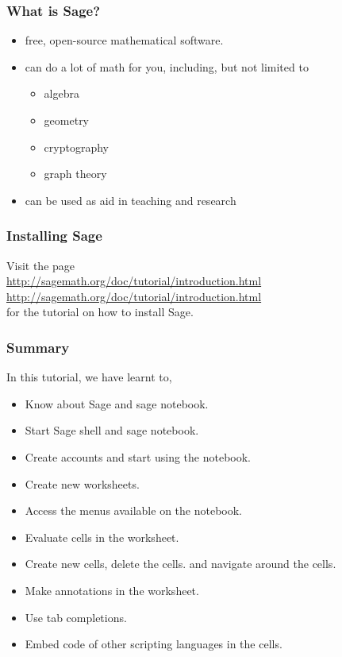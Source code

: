 \documentclass[presentation]{beamer}
\begin{document}
\begin{frame}
\frametitle{What is Sage?}
\label{sec-3}


\begin{itemize}
\item free, open-source mathematical software.
\item can do a lot of math for you, including, but not limited to
\begin{itemize}
\item algebra
\item geometry
\item cryptography
\item graph theory
\end{itemize}
\item can be used as aid in teaching and research
\end{itemize}
\end{frame}
\begin{frame}
\frametitle{Installing Sage}
\label{sec-4}

   Visit the page\\
\vspace{8pt}   
   \url{http://sagemath.org/doc/tutorial/introduction.html}\\
\vspace{5pt}   
   \url{http://sagemath.org/doc/tutorial/introduction.html}\\ 
\vspace{8pt}   
   for the tutorial on how to install Sage.
\end{frame}
\begin{frame}
\frametitle{Summary}
\label{sec-5}

 In this tutorial, we have learnt to, 


\begin{itemize}
\item Know about Sage and sage notebook.
\item Start Sage shell  and sage notebook.
\item Create accounts and start using the notebook.
\item Create new worksheets.
\item Access the menus available on the notebook.
\item Evaluate cells in the worksheet.
\item Create new cells, delete the cells.
     and navigate around the cells.
\item Make annotations in the worksheet.
\item Use tab completions.
\item Embed code of other scripting languages in the cells.
\end{itemize}
\end{frame}
\end{document}
